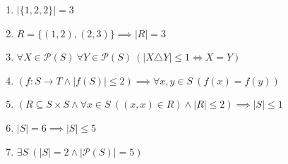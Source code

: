 \documentclass[11pt,a4paper]{article}
\begin{document}
\begin{enumerate}
\item $\displaystyle |\{1, 2, 2\}| = 3$
\item $\displaystyle R = \{(1, 2), (2, 3)\} \implies |R| = 3$
\item $\displaystyle \forall X \in \mathcal{P}(S)\ \forall Y \in \mathcal{P}(S)\ (|X \triangle Y| \le 1 \iff X = Y)$
\item $\displaystyle (f \colon S \to T \land |f(S)| \le 2) \implies \forall x, y \in S\ (f(x) = f(y))$
\item $\displaystyle (R \subseteq S \times S \land \forall x \in S\ ((x, x) \in R) \land |R| \le 2) \implies |S| \le 1$
\item $\displaystyle |S| = 6 \implies |S| \le 5$
\item $\displaystyle \exists S\ (|S| = 2 \land |\mathcal{P}(S)| = 5)$
\end{enumerate}
\end{document}
